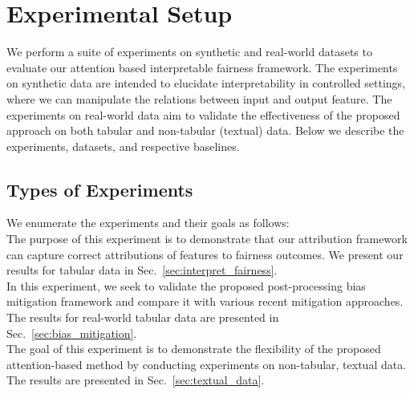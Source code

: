 \section{Experimental Setup}
We perform a suite of experiments on synthetic and real-world datasets to evaluate our attention based interpretable fairness framework. The experiments on synthetic data are intended to elucidate interpretability in controlled settings, where we can manipulate the relations between input and output feature. The experiments on real-world data aim to validate the effectiveness of the proposed approach on both tabular and non-tabular (textual) data. Below we describe the experiments, datasets, and respective baselines.  

\subsection{Types of Experiments}
We enumerate the experiments and their goals as follows: \\
 The purpose of this experiment is to demonstrate that our attribution framework can capture correct attributions of features to fairness outcomes. We present our results for tabular data in Sec.~\ref{sec:interpret_fairness}.\\
  In  this experiment, we seek to validate the proposed post-processing bias mitigation framework and compare it with various recent mitigation approaches. The results for real-world tabular data  are presented in Sec.~\ref{sec:bias_mitigation}.\\
 The goal of this experiment is to demonstrate the flexibility of the proposed attention-based method by conducting experiments on non-tabular, textual data. The results are presented in Sec.~\ref{sec:textual_data}.


